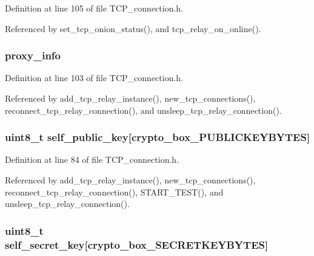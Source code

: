 Definition at line 105 of file T\+C\+P\+\_\+connection.\+h.



Referenced by set\+\_\+tcp\+\_\+onion\+\_\+status(), and tcp\+\_\+relay\+\_\+on\+\_\+online().

\hypertarget{struct_t_c_p___connections_aa737023350cf47e63993e3b4dc9a7472}{
\subsubsection[{proxy\+\_\+info}]{ proxy\+\_\+info}}\label{struct_t_c_p___connections_aa737023350cf47e63993e3b4dc9a7472}


Definition at line 103 of file T\+C\+P\+\_\+connection.\+h.



Referenced by add\+\_\+tcp\+\_\+relay\+\_\+instance(), new\+\_\+tcp\+\_\+connections(), reconnect\+\_\+tcp\+\_\+relay\+\_\+connection(), and unsleep\+\_\+tcp\+\_\+relay\+\_\+connection().

\hypertarget{struct_t_c_p___connections_ae726df8bdc26380e5a6c3187a00d6881}{
\subsubsection[{self\+\_\+public\+\_\+key}]{\setlength{\rightskip}{0pt plus 5cm}uint8\+\_\+t self\+\_\+public\+\_\+key\mbox{[}crypto\+\_\+box\+\_\+\+P\+U\+B\+L\+I\+C\+K\+E\+Y\+B\+Y\+T\+E\+S\mbox{]}}}\label{struct_t_c_p___connections_ae726df8bdc26380e5a6c3187a00d6881}


Definition at line 84 of file T\+C\+P\+\_\+connection.\+h.



Referenced by add\+\_\+tcp\+\_\+relay\+\_\+instance(), new\+\_\+tcp\+\_\+connections(), reconnect\+\_\+tcp\+\_\+relay\+\_\+connection(), S\+T\+A\+R\+T\+\_\+\+T\+E\+S\+T(), and unsleep\+\_\+tcp\+\_\+relay\+\_\+connection().

\hypertarget{struct_t_c_p___connections_aa05050f86513ff53fe9da81f73c72267}{
\subsubsection[{self\+\_\+secret\+\_\+key}]{\setlength{\rightskip}{0pt plus 5cm}uint8\+\_\+t self\+\_\+secret\+\_\+key\mbox{[}crypto\+\_\+box\+\_\+\+S\+E\+C\+R\+E\+T\+K\+E\+Y\+B\+Y\+T\+E\+S\mbox{]}}}\label{struct_t_c_p___connections_aa05050f86513ff53fe9da81f73c72267}


